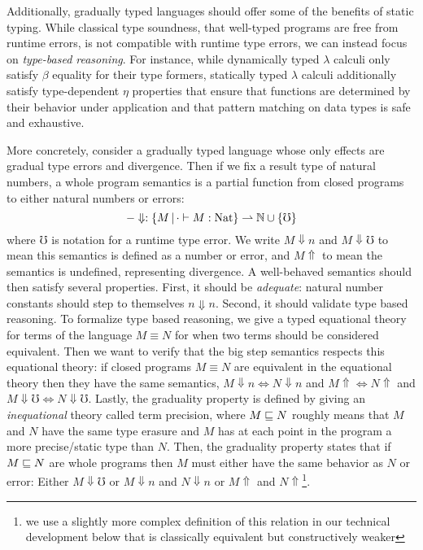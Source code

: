 Additionally, gradually typed languages should offer some of the
benefits of static typing. While classical type soundness, that
well-typed programs are free from runtime errors, is not compatible
with runtime type errors, we can instead focus on \emph{type-based
reasoning}. For instance, while dynamically typed $\lambda$ calculi
only satisfy $\beta$ equality for their type formers, statically typed
$\lambda$ calculi additionally satisfy type-dependent $\eta$
properties that ensure that functions are determined by their behavior
under application and that pattern matching on data types
is safe and exhaustive.

More concretely, consider a gradually typed language whose only
effects are gradual type errors and divergence. Then if we fix a
result type of natural numbers, a whole program semantics is a partial
function from closed programs to either natural numbers or errors:
\[ -\Downarrow : \{M \,|\, \cdot \vdash M : \text{Nat} \} \rightharpoonup \mathbb{N} \cup \{\mho\} \]
where $\mho$ is notation for a runtime type error. We write $M
\Downarrow n$ and $M\Downarrow \mho$ to mean this semantics is defined
as a number or error, and $M\Uparrow$ to mean the semantics is
undefined, representing divergence.
%
A well-behaved semantics should then satisfy several properties. First, it
should be \emph{adequate}: natural number constants should step to
themselves $n \Downarrow n$. Second, it should validate type based reasoning. To
formalize type based reasoning, we give a typed equational theory for
terms of the language $M \equiv N$ for when two terms should be
considered equivalent. Then we want to verify that the big step
semantics respects this equational theory: if closed programs $M \equiv
N$ are equivalent in the equational theory then they have the same
semantics, $M \Downarrow n \iff N \Downarrow n$ and $M\Uparrow \iff N
\Uparrow$ and $M \Downarrow \mho \iff N \Downarrow \mho$.
%
Lastly, the graduality property is defined by giving an
\emph{inequational} theory called term precision, where $M \sqsubseteq N$
roughly means that $M$ and $N$ have the same type erasure and $M$ has
at each point in the program a more precise/static type than $N$.
%
Then, the graduality property states that if $M \sqsubseteq N$ are whole
programs then $M$ must either have the same behavior as $N$ or error:
Either $M\Downarrow \mho$ or $M \Downarrow n $ and $N \Downarrow n$ or
$M \Uparrow $ and $N \Uparrow$\footnote{we use a slightly more complex
definition of this relation in our technical development below that is
classically equivalent but constructively weaker}.

